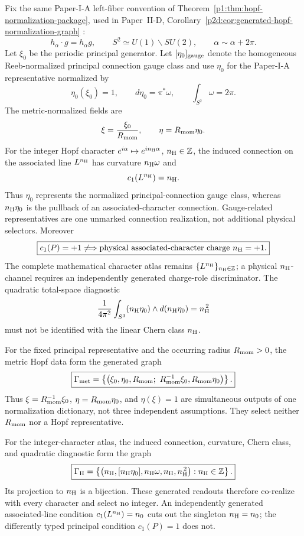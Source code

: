 \documentclass[12pt,a4paper]{article}
\begin{document}
Fix the same Paper-I-A left-fiber convention of
Theorem~\ref{p1:thm:hopf-normalization-package}, used in Paper~II-D,
Corollary~\ref{p2d:cor:generated-hopf-normalization-graph}
\cite{Kugelmann2026a}:
\[
        h_\alpha\cdot g=h_\alpha g,
        \qquad
        S^2\simeq U(1)\backslash SU(2),
        \qquad
        \alpha\sim\alpha+2\pi.
\]
Let \(\xi_0\) be the periodic principal generator.  Let
\([\eta_0]_{\rm gauge}\) denote the homogeneous Reeb-normalized principal
connection gauge class and use \(\eta_0\) for the Paper-I-A representative
normalized by
\[
 \eta_0(\xi_0)=1,
 \qquad
 d\eta_0=\pi^*\omega,
 \qquad
 \int_{S^2}\omega=2\pi.
\]
The metric-normalized fields are
\[
        \xi=\frac{\xi_0}{R_{\mathrm{mom}}},
        \qquad
        \eta=R_{\mathrm{mom}}\eta_0.
\]
For the integer Hopf character
\(e^{i\alpha}\mapsto e^{in_{\rm H}\alpha}\),
\(n_{\rm H}\in\mathbb Z\), the induced connection on the associated line
\(L^{n_{\rm H}}\) has curvature \(n_{\rm H}\omega\) and
\[
        c_1(L^{n_{\rm H}})=n_{\rm H}.
\]
Thus \(\eta_0\) represents the normalized principal-connection gauge class,
whereas \(n_{\rm H}\eta_0\) is the pullback of an associated-character
connection.
Gauge-related representatives are one unmarked connection realization, not
additional physical selectors.  Moreover
\[
 \boxed{c_1(P)=+1\not\Longrightarrow
 \text{physical associated-character charge }n_{\rm H}=+1.}
\]
The complete mathematical character atlas remains
\(\{L^{n_{\rm H}}\}_{n_{\rm H}\in\mathbb Z}\);
a physical \(n_{\rm H}\)-channel requires an independently generated charge-role
discriminator.  The quadratic total-space diagnostic
\[
 \frac{1}{4\pi^2}\int_{S^3}(n_{\rm H}\eta_0)
 \wedge d(n_{\rm H}\eta_0)=n_{\rm H}^{\,2}
\]
must not be identified with the linear Chern class \(n_{\rm H}\).

\begin{corollary}
\label{p2e:cor:joint-hopf-normalization-character-graphs}
For the fixed principal representative and the occurring radius
\(R_{\mathrm{mom}}>0\), the metric Hopf data form the generated graph
\[
 \boxed{\Gamma_{\rm met}
 =\left\{\left(\xi_0,\eta_0,R_{\mathrm{mom}};\
          R_{\mathrm{mom}}^{-1}\xi_0,R_{\mathrm{mom}}\eta_0\right)\right\}.}
\]
Thus \(\xi=R_{\mathrm{mom}}^{-1}\xi_0\), \(\eta=R_{\mathrm{mom}}\eta_0\), and
\(\eta(\xi)=1\) are simultaneous outputs of one normalization dictionary, not
three independent assumptions.  They select neither \(R_{\mathrm{mom}}\) nor a Hopf
representative.

For the integer-character atlas, the induced connection, curvature, Chern
class, and quadratic diagnostic form the graph
\[
 \boxed{\Gamma_{\rm H}
 =\left\{\left(
 n_{\rm H},[n_{\rm H}\eta_0],
 n_{\rm H}\omega,n_{\rm H},n_{\rm H}^{\,2}\right):
 n_{\rm H}\in\mathbb Z\right\}.}
\]
Its projection to \(n_{\rm H}\) is a bijection.  These generated readouts
therefore co-realize with every character and select no integer.  An
independently generated associated-line condition
\(c_1(L^{n_{\rm H}})=n_0\) cuts out the singleton
\(n_{\rm H}=n_0\); the differently typed principal condition \(c_1(P)=1\)
does not.
\end{corollary}
\end{document}
